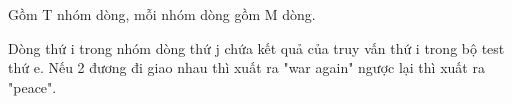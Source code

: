 Gồm T nhóm dòng, mỗi nhóm dòng gồm M dòng.

Dòng thứ i trong nhóm dòng thứ j chứa kết quả của truy vấn thứ i trong bộ test thứ e. Nếu 2 đương đi giao nhau thì xuất ra "war again" ngược lại thì xuất ra "peace".